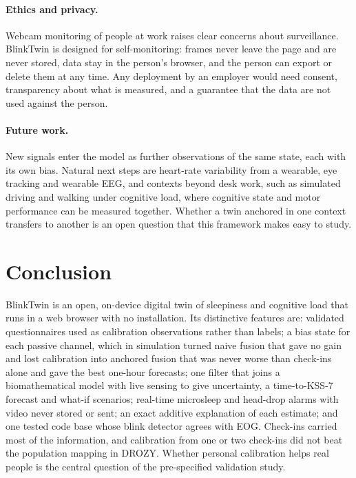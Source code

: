 \paragraph{Ethics and privacy.} Webcam monitoring of people at work raises clear concerns about surveillance. BlinkTwin is designed for self-monitoring: frames never leave the page and are never stored, data stay in the person's browser, and the person can export or delete them at any time. Any deployment by an employer would need consent, transparency about what is measured, and a guarantee that the data are not used against the person.

\paragraph{Future work.} New signals enter the model as further observations of the same state, each with its own bias. Natural next steps are heart-rate variability from a wearable, eye tracking and wearable EEG, and contexts beyond desk work, such as simulated driving and walking under cognitive load, where cognitive state and motor performance can be measured together. Whether a twin anchored in one context transfers to another is an open question that this framework makes easy to study.

\section{Conclusion}
\label{sec:conclusion}

BlinkTwin is an open, on-device digital twin of sleepiness and cognitive load that runs in a web browser with no installation. Its distinctive features are: validated questionnaires used as calibration observations rather than labels; a bias state for each passive channel, which in simulation turned naive fusion that gave no gain and lost calibration into anchored fusion that was never worse than check-ins alone and gave the best one-hour forecasts; one filter that joins a biomathematical model with live sensing to give uncertainty, a time-to-KSS-7 forecast and what-if scenarios; real-time microsleep and head-drop alarms with video never stored or sent; an exact additive explanation of each estimate; and one tested code base whose blink detector agrees with EOG. Check-ins carried most of the information, and calibration from one or two check-ins did not beat the population mapping in DROZY. Whether personal calibration helps real people is the central question of the pre-specified validation study.
